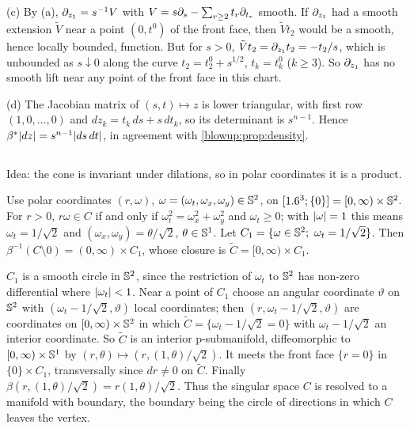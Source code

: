 (c) By (a), $\partial_{z_1}=s^{-1}V$ with $V=s\partial_s-\sum_{r\ge2}t_r\partial_{t_r}$ smooth. If $\partial_{z_1}$
had a smooth extension $\tilde V$ near a point $(0,t^0)$ of the front face, then $\tilde Vt_2$
would be a smooth, hence locally bounded, function. But for $s>0$, $\tilde Vt_2=\partial_{z_1}t_2=-t_2/s$,
which is unbounded as $s\downarrow0$ along the curve $t_2=t^0_2+s^{1/2}$, $t_k=t^0_k$ ($k\ge3$).
So $\partial_{z_1}$ has no smooth lift near any point of the front face in this chart.

(d) The Jacobian matrix of $(s,t)\mapsto z$ is lower triangular, with first row $(1,0,\dots,0)$
and $dz_k=t_k\,ds+s\,dt_k$, so its determinant is $s^{n-1}$. Hence
$\beta^*\lvert dz\rvert=s^{n-1}\lvert ds\,dt\rvert$, in agreement with \cref{blowup:prop:density}.

\subsection*{}
Idea: the cone is invariant under dilations, so in polar coordinates it is a product.

Use polar coordinates $(r,\omega)$, $\omega=(\omega_t,\omega_x,\omega_y)\in\mathbb{S}^2$, on
$[1.6^3;\{0\}]=[0,\infty)\times\mathbb{S}^2$. For $r>0$, $r\omega\in C$ if and only if
$\omega_t^2=\omega_x^2+\omega_y^2$ and $\omega_t\ge0$; with $\lvert \omega\rvert=1$ this means
$\omega_t=1/\sqrt2$ and $(\omega_x,\omega_y)=\theta/\sqrt2$, $\theta\in\mathbb{S}^1$. Let
$C_1=\{\omega\in\Sphere^2;\ \omega_t=1/\sqrt2\}$. Then $\beta^{-1}(C\setminus0)=(0,\infty)\times C_1$,
whose closure is $\tilde C=[0,\infty)\times C_1$.

$C_1$ is a smooth circle in $\mathbb{S}^2$, since the restriction of $\omega_t$ to $\mathbb{S}^2$
has non-zero differential where $\lvert \omega_t\rvert<1$. Near a point of $C_1$ choose an angular
coordinate $\vartheta$ on $\mathbb{S}^2$ with $(\omega_t-1/\sqrt2,\vartheta)$ local coordinates; then
$(r,\omega_t-1/\sqrt2,\vartheta)$ are coordinates on $[0,\infty)\times\mathbb{S}^2$ in which
$\tilde C=\{\omega_t-1/\sqrt2=0\}$ with $\omega_t-1/\sqrt2$ an interior coordinate. So $\tilde C$
is an interior p-submanifold, diffeomorphic to $[0,\infty)\times\mathbb{S}^1$ by
$(r,\theta)\mapsto(r,(1,\theta)/\sqrt2)$. It meets the front face $\{r=0\}$ in $\{0\}\times C_1$,
transversally since $dr\ne0$ on $\tilde C$. Finally $\beta(r,(1,\theta)/\sqrt2)=r(1,\theta)/\sqrt2$.
Thus the singular space $C$ is resolved to a manifold with boundary, the boundary being
the circle of directions in which $C$ leaves the vertex.

